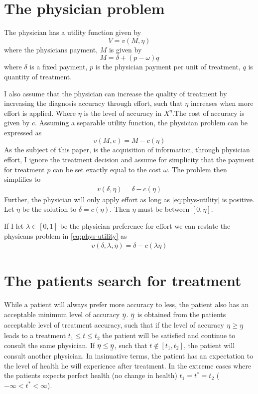 \documentclass[10pt,a4paper]{article} 					%
\newcommand{\ubar}[1]{\underaccent{\bar}{#1}}
\begin{document}
\section{The physician problem}

The physician has a utility function given by
\[
	V=v(M,\eta)
\]
where the physicians payment, $M$ is given by
\[
	M=\delta+(p-\omega)q
\]
where $\delta$ is a fixed payment, $p$ is the physician payment per unit of treatment, $q$ is quantity of treatment.

I also assume that the physician can increase the quality of treatment by increasing the diagnosis accuracy through effort, such that $\eta$ increases when more effort is applied. Where $\eta$ is the level of accuracy in $X^\eta$.The cost of accuracy is given by $c$. Assuming a separable utility function, the physician problem can be expressed as
\[
	v(M,e)=M-c(\eta)
\]
As the subject of this paper, is the acquisition of information, through physician effort, I ignore the treatment decision and assume for simplicity that the payment for treatment $p$ can be set exactly equal to the cost $\omega$. The problem then simplifies to
\begin{align}
v(\delta,\eta)=\delta-c(\eta)\label{eq:phys-utility}
\end{align}
Further, the physician will only apply effort as long as \cref{eq:phys-utility} is positive. Let $\bar{\eta}$ be the solution to $\delta=c(\eta)$. Then $\bar{\eta}$ must be between $[0,\bar{\eta}]$.

If I let $\lambda\in[0,1]$ be the physician preference for effort we can restate the physicans problem in \cref{eq:phys-utility} as
\begin{align*}
 	 v(\delta,\lambda,\bar{\eta})=\delta-c(\lambda\bar{\eta})\label{eq:phys-utility2}
\end{align*}

\section{The patients search for treatment}

While a patient will always prefer more accuracy to less, the patient also has an acceptable minimum level of accuracy $\ubar{\eta}$. $\ubar{\eta}$ is obtained from the patients acceptable level of treatment accuracy, such that if the level of accuracy $\eta\geq\ubar{\eta}$ leads to a treatment $t_1\leq t \leq t_2$ the patient will be satisfied and continue to consult the same physician. If $\eta\leq\ubar{\eta}$, such that $t\notin [t_1,t_2]$, the patient will consult another physician. In insinuative terms, the patient has an expectation to the level of health he will experience after treatment. In the extreme cases where the patients expects perfect health (no change in health) $t_1=t^*=t_2$ ($-\infty< t^* <\infty$).
\end{document}
